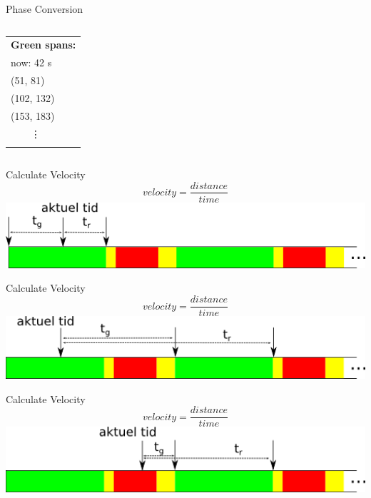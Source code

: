 \begin{frame}{Phase Conversion}
\begin{columns}
	\begin{column}{0.3\textwidth}
	\begin{center}
	\begin{tabular}{l}
	\textbf{Green spans:} \\
	now: 42 s\\
	(51, 81) \\
	(102, 132) \\
	(153, 183) \\
	\ \ \ \ \vdots\\\\
	\end{tabular}
	\end{center}
	\end{column}
\end{columns}
\end{frame}

\begin{frame}{Calculate Velocity}
\[velocity = \frac{distance}{time}\]
\includegraphics[width=1\textwidth]{images/algphases1.png}
\end{frame}

\begin{frame}{Calculate Velocity}
\[velocity = \frac{distance}{time}\]
\includegraphics[width=1\textwidth]{images/algphases2.png}
\end{frame}

\begin{frame}{Calculate Velocity}
\[velocity = \frac{distance}{time}\]
\includegraphics[width=1\textwidth]{images/algphases3.png}
\end{frame}







